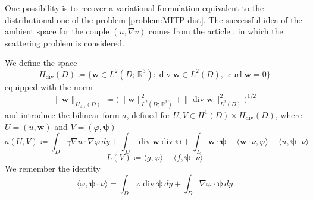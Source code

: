 \documentclass[10pt, a4paper, twoside, openright]{book}
\theoremstyle{definition}
\theoremstyle{plain}
\theoremstyle{plain}
\theoremstyle{plain}
\theoremstyle{plain}
\theoremstyle{plain}
\theoremstyle{plain}
\theoremstyle{plain}
\theoremstyle{plain}
\DeclareMathOperator{\divergence}{div}
\DeclareMathOperator{\curl}{curl}
\let\phi\varphi
\begin{document}
One possibility is to recover a variational formulation equivalent to the distributional one of the problem \ref{problem:MITP-dist}. The successful idea of the ambient space for the couple $(u,\nabla v)$ comes from the article \cite{cakoni-colton-haddar:lsm}, in which the scattering problem is considered.
\par
We define the space
\begin{equation}
 H_{\divergence}(D)\coloneqq\bigl\{\bm{w}\in L^2(D;\,\mathbb{R}^3):\divergence\bm{w} \in L^2(D),\, \curl\bm{w}=0 \bigr\}
\end{equation}
equipped with the norm
\begin{equation}
 \|\bm{w}\|_{H_{\divergence}(D)}\coloneqq\bigl(\|\bm{w}\|^2_{L^2(D;\,\mathbb{R}^3)} + \|\divergence\bm{w}\|^2_{L^2(D)}\bigr)^{1/2}
\end{equation}
and introduce the bilinear form $a$, defined for $U,V\in H^1(D)\times H_{\divergence}(D)$, where $U=(u,\bm{w})$ and $V=(\phi,\bm{\psi})$
\begin{equation}
 a(U,V)\coloneqq \int_D \gamma \nabla u\cdot\nabla \phi\,dy + \int_D\divergence \bm{w}\divergence\bm{\psi} + \int_D\bm{w}\cdot\bm{\psi} - \langle \bm{w}\cdot\nu, \phi \rangle- \langle u,\bm{\psi}\cdot\nu\rangle
\end{equation}
\begin{equation}
 L(V)\coloneqq \langle g, \phi\rangle - \langle f, \bm{\psi}\cdot\nu\rangle
\end{equation}
We remember the identity
\begin{equation}
 \label{eq:identity-duality}
 \langle\phi,\bm{\psi}\cdot\nu\rangle = \int_D\phi\divergence\bm\psi\,dy + \int_D\nabla\phi\cdot\bm{\psi}\,dy
\end{equation}
\end{document}
